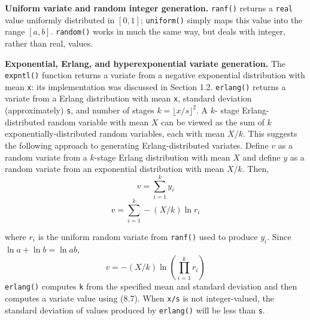 \textbf{Uniform variate and random integer generation.} \texttt{ranf()} returns a \texttt{real}
value uniformly distributed in $[0,1]$; \texttt{uniform()} simply maps this value into
the range $[a,b]$. \texttt{random()} works in much the same way, but deals with
integer, rather than real, values.

\textbf{Exponential, Erlang, and hyperexponential variate generation.} The
\texttt{expntl()} function returns a variate from a negative exponential distribution
with mean \texttt{x}: its implementation was discussed in Section 1.2.
\texttt{erlang()} returns a variate from a Erlang distribution with mean \texttt{x},
standard deviation (approximately) \texttt{s}, and number of stages $k=\lfloor x/s\rfloor^2$. A $k$-
stage Erlang-distributed random variable with mean $X$ can be viewed as the
sum of $k$ exponentially-distributed random variables, each with mean $X/k$.
This suggests the following approach to generating Erlang-distributed
variates. Define $v$ as a random variate from a $k$-stage Erlang distribution
with mean $X$ and define $y$ as a random variate from an exponential
distribution with mean $X/k$. Then,
\begin{equation}
v=\sum_{i=1}^{k} y_i
\end{equation}
\begin{equation}
v=\sum_{i=1}^{k} -(X/k)\ln r_i
\end{equation}

\noindent where $r_i$ is the uniform random variate from \texttt{ranf()} used to produce $y_i$.
Since $\ln a+\ln b=\ln ab$,
\begin{equation}
v=-(X/k)\ln\left(\prod_{i=1}^{k}r_i\right)
\end{equation}
\texttt{erlang()} computes \texttt{k} from the specified mean and standard deviation and
then computes a variate value using (8.7). When \texttt{x/s} is not integer-valued,
the standard deviation of values produced by \texttt{erlang()} will be less than \texttt{s}.

